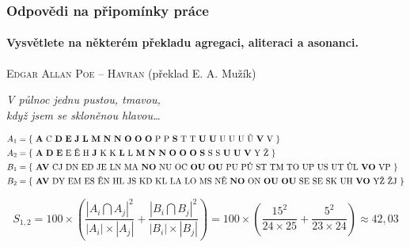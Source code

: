 \documentclass[12pt,xcolor=usenames,dvipsnames]{beamer}
\begin{document}
\begin{frame}
	\frametitle{Odpovědi na připomínky práce}
	\framesubtitle{Vysvětlete na některém překladu \textbf{agregaci}, aliteraci a asonanci.}
	\begin{center}
	
		\textsc{Edgar Allan Poe -- Havran} {\tiny (překlad E. A. Mužík)}
	
		\emph{V půlnoc jednu pustou, tmavou,\\
		když jsem se skloněnou hlavou\dots}

		\begin{tiny}
			\begin{align*}
				A_1 &= \text{\{ \textbf{A} C \textbf{D} \textbf{E}       \textbf{J}     \textbf{L}   \textbf{M} \textbf{N} \textbf{N} \textbf{O} \textbf{O} \textbf{O} P P \textbf{S} T T \textbf{U} \textbf{U} U U U Ů \textbf{V} V \}}\\
				A_2 &= \text{\{ \textbf{A}   \textbf{D} \textbf{E} E Ě H \textbf{J} K K \textbf{L} L \textbf{M} \textbf{N} \textbf{N} \textbf{O} \textbf{O} \textbf{O}     \textbf{S} S S \textbf{U} \textbf{U} \textbf{V} Y Ž \}}\\
				B_1 &= \text{\{ \textbf{AV} CJ DN ED JE LN MA                   \textbf{NO} NU OC \textbf{OU} \textbf{OU} PU PŮ ST TM TO UP US UT ŮL \textbf{VO} VP \}}\\   
				B_2 &= \text{\{ \textbf{AV} DY EM ES ĚN HL JS KD KL LA LO MS NĚ \textbf{NO} ON    \textbf{OU} \textbf{OU} SE SE SK UH \textbf{VO} YŽ ŽJ \}}
			\end{align*}
		\end{tiny}
	
		\vspace{-50pt}
		\begin{footnotesize}
		\begin{equation*}
			S_{1,2}=100 \times \left ( \frac{\left | A_i \bigcap A_j \right |^{2}}{\left | A_i \right | \times \left | A_j \right |} + \frac{\left | B_i \bigcap B_j \right |^{2}}{\left | B_i \right | \times \left | B_j \right |} \right ) = 100 \times \left ( \frac{15^{2}}{24 \times 25} + \frac{5^{2}}{23 \times 24} \right ) \approx  42,03
		\end{equation*}
		
	\end{footnotesize}

	\end{center}


\end{frame}
\end{document}
